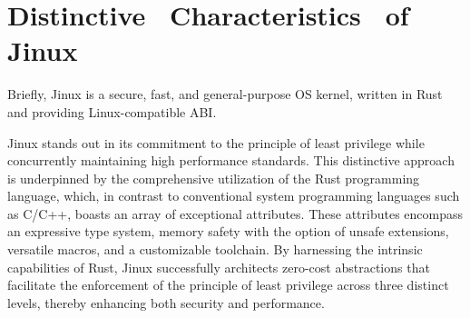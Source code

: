 \documentclass[conference]{IEEEtran}
\begin{document}
\section{Distinctive  Characteristics  of  Jinux}

Briefly, Jinux is a secure, fast, and general-purpose OS kernel, written in Rust and providing Linux-compatible ABI.\cite{b2}

Jinux stands out in its commitment to the principle of least privilege while concurrently maintaining high performance standards. This distinctive approach is underpinned by the comprehensive utilization of the Rust programming language, which, in contrast to conventional system programming languages such as C/C++, boasts an array of exceptional attributes. These attributes encompass an expressive type system, memory safety with the option of unsafe extensions, versatile macros, and a customizable toolchain. By harnessing the intrinsic capabilities of Rust, Jinux successfully architects zero-cost abstractions that facilitate the enforcement of the principle of least privilege across three distinct levels, thereby enhancing both security and performance.
\end{document}
